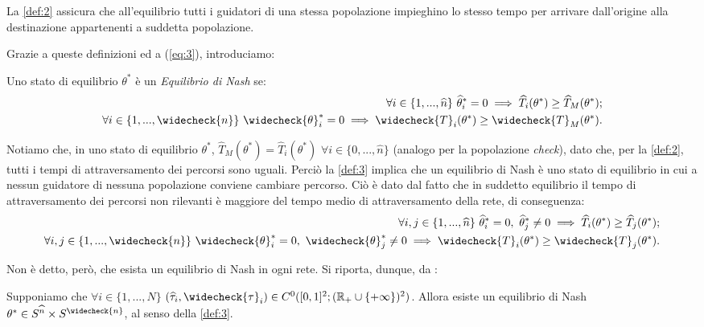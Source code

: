 La \autoref{def:2} assicura che all'equilibrio tutti i guidatori di una stessa popolazione impieghino lo stesso tempo per
arrivare dall'origine alla destinazione appartenenti a suddetta popolazione.

Grazie a queste definizioni ed a (\autoref{eq:3}), introduciamo:

\begin{definition}\label{def:3}
    Uno stato di equilibrio $\theta^{*}$ è un \textit{Equilibrio di Nash} se:
    \begin{equation*}
        \begin{split}
        \forall i\in\{1,...,\widehat{n}\}\text{ }\widehat{\theta}_i^{*}=0\implies\widehat{T}_i(\theta^*)\geq\widehat{T}_M(\theta^*);\\
        \forall i\in\{1,...,\widecheck{n}\}\text{ }\widecheck{\theta}_i^{*}=0\implies\widecheck{T}_i(\theta^*)\geq\widecheck{T}_M(\theta^*).
        \end{split}
    \end{equation*}
\end{definition}
Notiamo che, in uno stato di equilibrio $\theta^*$, $\widehat{T}_M(\theta^*)=\widehat{T}_i(\theta^*)$ $\forall i\in\{0,...,\widehat{n}\}$ (analogo per la popolazione \textit{check}),
dato che, per la \autoref{def:2}, tutti i tempi di attraversamento dei percorsi sono uguali. Perciò la \autoref{def:3}
implica che un equilibrio di Nash è uno stato di equilibrio in cui a nessun guidatore di nessuna popolazione conviene cambiare percorso.
Ciò è dato dal fatto che in suddetto equilibrio il tempo di attraversamento dei percorsi non rilevanti è 
maggiore del tempo medio di attraversamento della rete, di conseguenza:
\begin{equation*}
    \begin{split}
    \forall i,j\in\{1,...,\widehat{n}\}\text{ }\widehat{\theta}_i^{*}=0,\text{ }\widehat{\theta}_j^*\neq0\implies\widehat{T}_i(\theta^*)\geq\widehat{T}_j(\theta^*);\\
    \forall i,j\in\{1,...,\widecheck{n}\}\text{ }\widecheck{\theta}_i^{*}=0,\text{ }\widecheck{\theta}_j^*\neq0\implies\widecheck{T}_i(\theta^*)\geq\widecheck{T}_j(\theta^*).
    \end{split}
\end{equation*}

Non è detto, però, che esista un equilibrio di Nash in ogni rete. Si riporta, dunque, da \cite[Cap. 2]{MR4911797}:
\begin{theorem}\label{th:1}
    Supponiamo che $\forall i\in\{1,...,N\}$ $(\widehat{\tau}_i,\widecheck{\tau}_i)\in C^0([0,1]^2;(\mathbb{R}_+\cup\{+\infty\})^2)$.
    Allora esiste un equilibrio di Nash $\theta^*\in S^{\widehat{n}}\times S^{\widecheck{n}}$, al senso della \autoref{def:3}.
\end{theorem}


